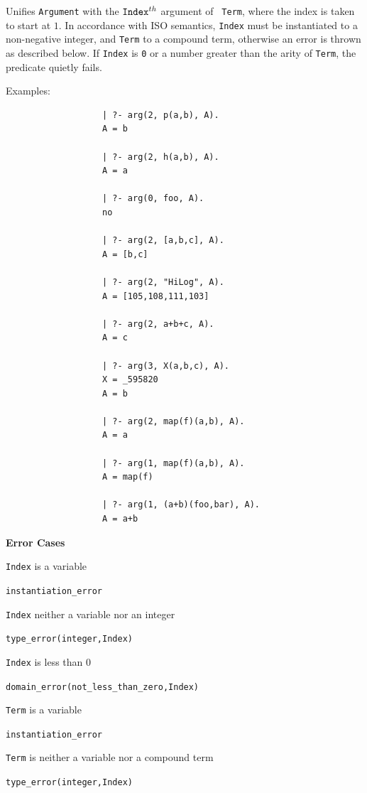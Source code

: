 \begin{description}
%
  Unifies {\tt Argument} with the ${\tt Index}^{th}$ argument of {\tt
    Term}\@, where the index is taken to start at $1$.  In accordance
  with ISO semantics, {\tt Index} must be instantiated to a
  non-negative integer, and {\tt Term} to a compound term, otherwise
  an error is thrown as described below.  If {\tt Index} is {\tt 0} or
  a number greater than the arity of {\tt Term}, the predicate quietly
  fails.

    Examples:
    {\footnotesize
     \begin{verbatim}
                   | ?- arg(2, p(a,b), A).
                   A = b

                   | ?- arg(2, h(a,b), A).
                   A = a

                   | ?- arg(0, foo, A).
                   no

                   | ?- arg(2, [a,b,c], A).
                   A = [b,c]

                   | ?- arg(2, "HiLog", A).
                   A = [105,108,111,103]

                   | ?- arg(2, a+b+c, A).
                   A = c

                   | ?- arg(3, X(a,b,c), A).
                   X = _595820 
                   A = b 

                   | ?- arg(2, map(f)(a,b), A).
                   A = a

                   | ?- arg(1, map(f)(a,b), A). 
                   A = map(f)

                   | ?- arg(1, (a+b)(foo,bar), A).
                   A = a+b
     \end{verbatim}}

{\bf Error Cases} 
\bi
\item 	{\tt Index} is a variable
\bi
\item    {\tt instantiation\_error}
\ei
\item 	{\tt Index} neither a variable nor an integer
\bi
\item    {\tt type\_error(integer,Index)}
\ei
\item 	{\tt Index} is less than 0
\bi
\item    {\tt domain\_error(not\_less\_than\_zero,Index)}
\ei
\item 	{\tt Term} is a variable
\bi
\item    {\tt instantiation\_error}
\ei
\item 	{\tt Term} is neither a variable nor a compound term
\bi
\item    {\tt type\_error(integer,Index)}
\ei
\ei


\end{description}
